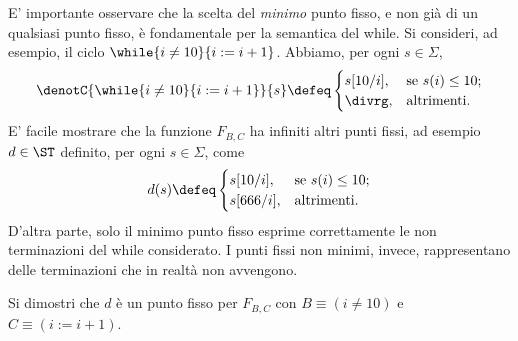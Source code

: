 E' importante osservare che la scelta del \emph{minimo} punto fisso,
e non gi\`a di un qualsiasi punto fisso, \`e fondamentale
per la semantica del while.
Si consideri, ad esempio, il ciclo $\while{i \neq 10}{i := i+1}$.
Abbiamo, per ogni $s \in \Sigma$,
\[
  \denotC{\while{i \neq 10}{i := i+1}}{s}
    \defeq
      \begin{cases}
        s[10/i], &\text{se $s(i) \leq 10$;} \\
        \divrg, &\text{altrimenti.}
      \end{cases}
\]
E' facile mostrare che la funzione $F_{B,C}$ ha infiniti altri punti fissi,
ad esempio $d \in \ST$ definito, per ogni $s \in \Sigma$, come
\begin{align}
  d(s)
    \defeq
      \begin{cases}
        s[10/i], &\text{se $s(i) \leq 10$;} \\
        s[666/i], &\text{altrimenti.}
      \end{cases}
\end{align}
D'altra parte, solo il minimo punto fisso esprime correttamente
le non terminazioni del while considerato.
I punti fissi non minimi, invece, rappresentano delle terminazioni
che in realt\`a non avvengono.

\begin{esercizio}
Si dimostri che $d$ \`e un punto fisso per $F_{B,C}$
con $B \equiv (i \neq 10)$ e $C \equiv (i := i+1)$.
\end{esercizio}
